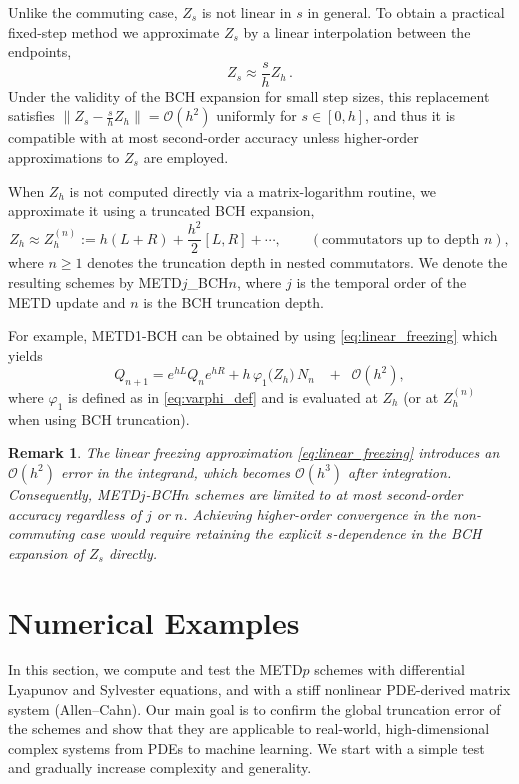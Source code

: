 \documentclass[12pt]{article}
\newtheorem{rmk}{Remark}
\begin{document}
Unlike the commuting case, $Z_s$ is not linear in $s$ in general. To obtain a practical
fixed-step method we approximate $Z_s$ by a linear interpolation between the endpoints,
\begin{equation}
\label{eq:linear_freezing}
Z_s \approx \frac{s}{h}Z_h\,.
\end{equation}
Under the validity of the BCH expansion for small step sizes, this replacement satisfies
$\|Z_s-\tfrac{s}{h}Z_h\|=\mathcal O(h^2)$ uniformly for $s\in[0,h]$, and thus it is
compatible with at most second-order accuracy unless higher-order approximations to $Z_s$
are employed.

When $Z_h$ is not computed directly via a matrix-logarithm routine, we approximate it
using a truncated BCH expansion,
\begin{equation}
\label{eq:Zh_trunc}
Z_h \approx Z_h^{(n)}:=h(L+R)+\frac{h^2}{2}[L,R]+\cdots,\qquad (\text{commutators up to depth }n),
\end{equation}
where $n\ge 1$ denotes the truncation depth in nested commutators. We denote the resulting
schemes by METD$j$\_BCH$n$, where $j$ is the temporal order of the METD update and $n$ is the
BCH truncation depth.

For example, METD1-BCH can be obtained by using \eqref{eq:linear_freezing} which yields
\begin{equation}
\label{eq:bch_metd1}
Q_{n+1} = e^{hL}Q_ne^{hR}
+ h\,\varphi_1\bigl(Z_h\bigr)\,N_n
\;\;\; +\;\; \mathcal O(h^2),
\end{equation}
where $\varphi_1$ is defined as in \eqref{eq:varphi_def} and is evaluated at $Z_h$ (or at
$Z_h^{(n)}$ when using BCH truncation).

\begin{rmk}
\label{rmk:order_limit}
The linear freezing approximation \eqref{eq:linear_freezing} introduces an $\mathcal{O}(h^2)$ 
error in the integrand, which becomes $\mathcal{O}(h^3)$ after integration. Consequently, 
METD$j$-BCH$n$ schemes are limited to at most second-order accuracy regardless of $j$ or $n$. 
Achieving higher-order convergence in the non-commuting case would require retaining the 
explicit $s$-dependence in the BCH expansion of $Z_s$ directly.
\end{rmk}



\section{Numerical Examples}
In this section, we compute and test the METD$p$ schemes with differential Lyapunov and Sylvester equations, and with a stiff nonlinear PDE-derived matrix system (Allen–Cahn). Our main goal is to confirm the global truncation error of the schemes and show that they are applicable to real-world, high-dimensional complex systems from PDEs to machine learning. We start with a simple test and gradually increase complexity and generality.
\end{document}
